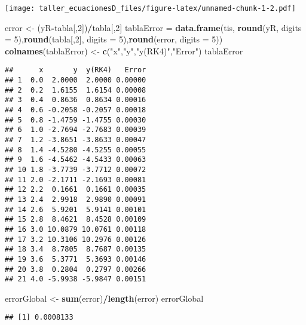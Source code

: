 \documentclass[]{article}
\newenvironment{Shaded}{\begin{snugshade}}{\end{snugshade}}
\newcommand{\KeywordTok}[1]{\textcolor[rgb]{0.13,0.29,0.53}{\textbf{#1}}}
\newcommand{\DataTypeTok}[1]{\textcolor[rgb]{0.13,0.29,0.53}{#1}}
\newcommand{\DecValTok}[1]{\textcolor[rgb]{0.00,0.00,0.81}{#1}}
\newcommand{\StringTok}[1]{\textcolor[rgb]{0.31,0.60,0.02}{#1}}
\newcommand{\OperatorTok}[1]{\textcolor[rgb]{0.81,0.36,0.00}{\textbf{#1}}}
\newcommand{\NormalTok}[1]{#1}
\begin{document}
\texttt{[image: taller\_ecuacionesD\_files/figure-latex/unnamed-chunk-1-2.pdf]}

\begin{Shaded}
\begin{Highlighting}[]
\NormalTok{error <-}\StringTok{ }\NormalTok{(yR}\OperatorTok{-}\NormalTok{tabla[,}\DecValTok{2}\NormalTok{])}\OperatorTok{/}\NormalTok{tabla[,}\DecValTok{2}\NormalTok{]}
\NormalTok{tablaError =}\StringTok{ }\KeywordTok{data.frame}\NormalTok{(tis, }\KeywordTok{round}\NormalTok{(yR, }\DataTypeTok{digits =} \DecValTok{5}\NormalTok{),}\KeywordTok{round}\NormalTok{(tabla[,}\DecValTok{2}\NormalTok{], }\DataTypeTok{digits =} \DecValTok{5}\NormalTok{),}\KeywordTok{round}\NormalTok{(error, }\DataTypeTok{digits =} \DecValTok{5}\NormalTok{))}
\KeywordTok{colnames}\NormalTok{(tablaError) <-}\StringTok{ }\KeywordTok{c}\NormalTok{(}\StringTok{"x"}\NormalTok{,}\StringTok{"y"}\NormalTok{,}\StringTok{"y(RK4)"}\NormalTok{,}\StringTok{"Error"}\NormalTok{)}
\NormalTok{tablaError}
\end{Highlighting}
\end{Shaded}

\begin{verbatim}
##      x       y  y(RK4)   Error
## 1  0.0  2.0000  2.0000 0.00000
## 2  0.2  1.6155  1.6154 0.00008
## 3  0.4  0.8636  0.8634 0.00016
## 4  0.6 -0.2058 -0.2057 0.00018
## 5  0.8 -1.4759 -1.4755 0.00030
## 6  1.0 -2.7694 -2.7683 0.00039
## 7  1.2 -3.8651 -3.8633 0.00047
## 8  1.4 -4.5280 -4.5255 0.00055
## 9  1.6 -4.5462 -4.5433 0.00063
## 10 1.8 -3.7739 -3.7712 0.00072
## 11 2.0 -2.1711 -2.1693 0.00081
## 12 2.2  0.1661  0.1661 0.00035
## 13 2.4  2.9918  2.9890 0.00091
## 14 2.6  5.9201  5.9141 0.00101
## 15 2.8  8.4621  8.4528 0.00109
## 16 3.0 10.0879 10.0761 0.00118
## 17 3.2 10.3106 10.2976 0.00126
## 18 3.4  8.7805  8.7687 0.00135
## 19 3.6  5.3771  5.3693 0.00146
## 20 3.8  0.2804  0.2797 0.00266
## 21 4.0 -5.9938 -5.9847 0.00151
\end{verbatim}

\begin{Shaded}
\begin{Highlighting}[]
\NormalTok{errorGlobal <-}\StringTok{ }\KeywordTok{sum}\NormalTok{(error)}\OperatorTok{/}\KeywordTok{length}\NormalTok{(error)}
\NormalTok{errorGlobal}
\end{Highlighting}
\end{Shaded}

\begin{verbatim}
## [1] 0.0008133
\end{verbatim}
\end{document}
